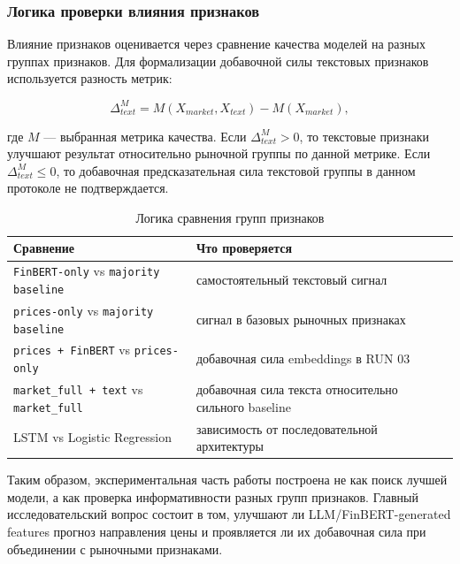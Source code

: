 \subsubsection{Логика проверки влияния признаков}

Влияние признаков оценивается через сравнение качества моделей на разных группах признаков. Для формализации добавочной силы текстовых признаков используется разность метрик:

\[
\Delta_{text}^{M} = M(X_{market}, X_{text}) - M(X_{market}),
\]

где $M$ --- выбранная метрика качества. Если $\Delta_{text}^{M} > 0$, то текстовые признаки улучшают результат относительно рыночной группы по данной метрике. Если $\Delta_{text}^{M} \leq 0$, то добавочная предсказательная сила текстовой группы в данном протоколе не подтверждается.

\begin{table}[htbp]
\centering
\begin{tabular}{ll}
\toprule
Сравнение & Что проверяется \\
\midrule
\texttt{FinBERT-only} vs \texttt{majority baseline} & самостоятельный текстовый сигнал \\
\texttt{prices-only} vs \texttt{majority baseline} & сигнал в базовых рыночных признаках \\
\texttt{prices + FinBERT} vs \texttt{prices-only} & добавочная сила embeddings в RUN 03 \\
\texttt{market\_full + text} vs \texttt{market\_full} & добавочная сила текста относительно сильного baseline \\
LSTM vs Logistic Regression & зависимость от последовательной архитектуры \\
\bottomrule
\end{tabular}
\caption{Логика сравнения групп признаков}
\label{tab:feature_group_comparison_logic}
\end{table}

Таким образом, экспериментальная часть работы построена не как поиск лучшей модели, а как проверка информативности разных групп признаков. Главный исследовательский вопрос состоит в том, улучшают ли LLM/FinBERT-generated features прогноз направления цены и проявляется ли их добавочная сила при объединении с рыночными признаками.
